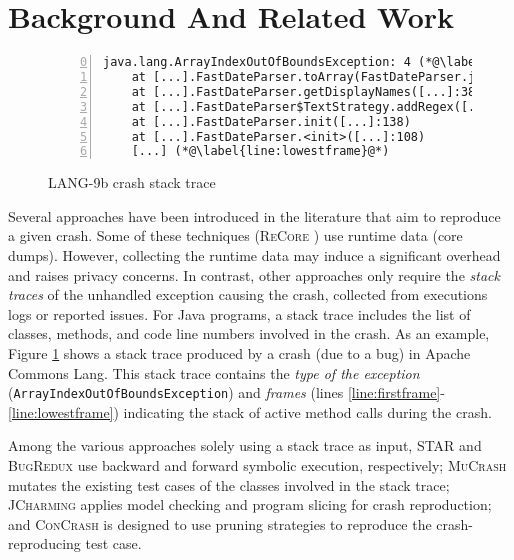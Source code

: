 \section{Background And Related Work}

\begin{figure}[t]
  \begin{lstlisting}[numbers=left,
      firstnumber=0]
  java.lang.ArrayIndexOutOfBoundsException: 4 (*@\label{line:exception}@*)
    at [...].FastDateParser.toArray(FastDateParser.java:413) (*@\label{line:firstframe}@*)
    at [...].FastDateParser.getDisplayNames([...]:381)
    at [...].FastDateParser$TextStrategy.addRegex([...]:664) (*@\label{line:thirdframe}@*)
    at [...].FastDateParser.init([...]:138)
    at [...].FastDateParser.<init>([...]:108)
    [...] (*@\label{line:lowestframe}@*)
  \end{lstlisting}
  \caption{LANG-9b crash stack trace \cite{just2014defects4j}}
  \label{lst:moho:stacktrace}
\end{figure}

Several approaches have been introduced in the literature that aim to reproduce a given crash. Some of these techniques (\eg \textsc{ReCore} \cite{Rossler2013}) use runtime data (\ie core dumps). However, collecting the runtime data may induce a significant overhead and raises privacy concerns. In contrast, other approaches \cite{BPT17concrash, Chen2015, Nayrolles2017, Xuan2015} only require the \textit{stack traces} of the unhandled exception causing the crash, collected from executions logs or reported issues.
For Java programs, a stack trace includes the list of classes, methods, and code line numbers involved in the crash. As an example, Figure \ref{lst:moho:stacktrace} shows a stack trace produced by a crash (due to a bug) in \textrm{Apache Commons Lang}. This stack trace contains the \textit{type of the exception} (\texttt{Ar\-ray\-In\-dex\-Out\-Of\-Bounds\-Ex\-cep\-tion}) and \textit{frames} (lines \ref{line:firstframe}-\ref{line:lowestframe}) indicating the stack of active method calls during the crash. 

Among the various approaches solely using a stack trace as input, \textsc{STAR} \cite{Chen2015} and \textsc{BugRedux} \cite{jin2012bugredux} use backward and forward symbolic execution, respectively; \textsc{MuCrash} \cite{Xuan2015} mutates the existing test cases of the classes involved in the stack trace; \textsc{JCharming} \cite{Nayrolles2017, nayrolles2015jcharming} applies model checking and program slicing for crash reproduction; and \textsc{ConCrash} \cite{BPT17concrash} is designed to use pruning strategies to reproduce the crash-reproducing test case. 

